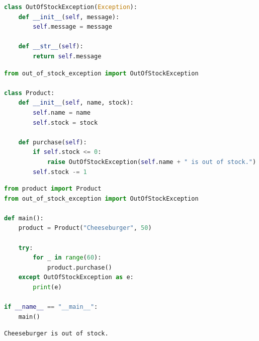 
\begin{lstlisting}[language=Python]
class OutOfStockException(Exception):
    def __init__(self, message):
        self.message = message

    def __str__(self):
        return self.message
\end{lstlisting}

\begin{lstlisting}[language=Python]
from out_of_stock_exception import OutOfStockException

class Product:
    def __init__(self, name, stock):
        self.name = name
        self.stock = stock

    def purchase(self):
        if self.stock <= 0:
            raise OutOfStockException(self.name + " is out of stock.")
        self.stock -= 1
\end{lstlisting}

\begin{lstlisting}[language=Python]
from product import Product
from out_of_stock_exception import OutOfStockException

def main():
    product = Product("Cheeseburger", 50)

    try:
        for _ in range(60):
            product.purchase()
    except OutOfStockException as e:
        print(e)

if __name__ == "__main__":
    main()
\end{lstlisting}

\begin{tcolorbox}
    \begin{verbatim}
Cheeseburger is out of stock.
	\end{verbatim}
\end{tcolorbox}

\newpage